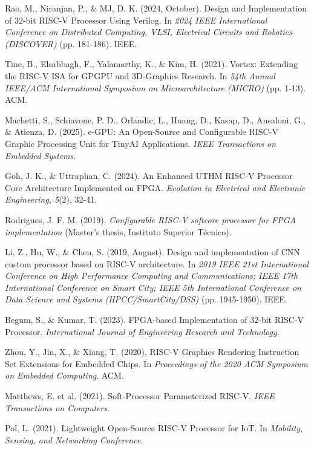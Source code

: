 \documentclass[a4paper,twoside]{article}
\begin{document}
\begin{thebibliography}{99}

Rao, M., Niranjan, P., \& MJ, D. K. (2024, October). Design and Implementation of 32-bit RISC-V Processor Using Verilog. In \textit{2024 IEEE International Conference on Distributed Computing, VLSI, Electrical Circuits and Robotics (DISCOVER)} (pp. 181-186). IEEE.

Tine, B., Elsabbagh, F., Yalamarthy, K., \& Kim, H. (2021). Vortex: Extending the RISC-V ISA for GPGPU and 3D-Graphics Research. In \textit{54th Annual IEEE/ACM International Symposium on Microarchitecture (MICRO)} (pp. 1-13). ACM.

Machetti, S., Schiavone, P. D., Orlandic, L., Huang, D., Kasap, D., Ansaloni, G., \& Atienza, D. (2025). e-GPU: An Open-Source and Configurable RISC-V Graphic Processing Unit for TinyAI Applications. \textit{IEEE Transactions on Embedded Systems}.

Goh, J. K., \& Uttraphan, C. (2024). An Enhanced UTHM RISC-V Processor Core Architecture Implemented on FPGA. \textit{Evolution in Electrical and Electronic Engineering, 5}(2), 32-41.

Rodrigues, J. F. M. (2019). \textit{Configurable RISC-V softcore processor for FPGA implementation} (Master's thesis, Instituto Superior Técnico).

Li, Z., Hu, W., \& Chen, S. (2019, August). Design and implementation of CNN custom processor based on RISC-V architecture. In \textit{2019 IEEE 21st International Conference on High Performance Computing and Communications; IEEE 17th International Conference on Smart City; IEEE 5th International Conference on Data Science and Systems (HPCC/SmartCity/DSS)} (pp. 1945-1950). IEEE.

Begum, S., \& Kumar, T. (2023). FPGA-based Implementation of 32-bit RISC-V Processor. \textit{International Journal of Engineering Research and Technology}.

Zhou, Y., Jin, X., \& Xiang, T. (2020). RISC-V Graphics Rendering Instruction Set Extensions for Embedded Chips. In \textit{Proceedings of the 2020 ACM Symposium on Embedded Computing}. ACM.

Matthews, E. et al. (2021). Soft-Processor Parameterized RISC-V. \textit{IEEE Transactions on Computers}.

Pol, L. (2021). Lightweight Open-Source RISC-V Processor for IoT. In \textit{Mobility, Sensing, and Networking Conference}.


\end{thebibliography}
\end{document}
